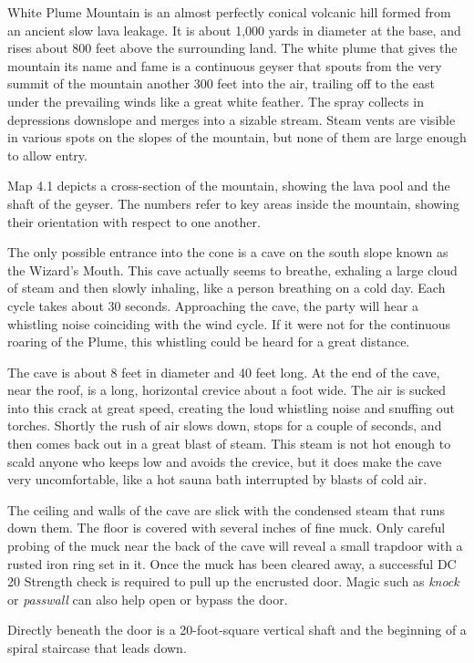 \documentclass[10pt,a4paper,twoside,bg=print,twocolumn,openany,nodeprecatedcode]{dndbook}
\begin{document}
White Plume Mountain is an almost perfectly conical volcanic hill formed from an ancient slow lava leakage. It is about 1,000 yards in diameter at the base, and rises about 800 feet above the surrounding land. The white plume that gives the mountain its name and fame is a continuous geyser that spouts from the very summit of the mountain another 300 feet into the air, trailing off to the east under the prevailing winds like a great white feather. The spray collects in depressions downslope and merges into a sizable stream. Steam vents are visible in various spots on the slopes of the mountain, but none of them are large enough to allow entry.

Map 4.1 depicts a cross-section of the mountain, showing the lava pool and the shaft of the geyser. The numbers refer to key areas inside the mountain, showing their orientation with respect to one another.

The only possible entrance into the cone is a cave on the south slope known as the Wizard's Mouth. This cave actually seems to breathe, exhaling a large cloud of steam and then slowly inhaling, like a person breathing on a cold day. Each cycle takes about 30 seconds. Approaching the cave, the party will hear a whistling noise coinciding with the wind cycle. If it were not for the continuous roaring of the Plume, this whistling could be heard for a great distance.

The cave is about 8 feet in diameter and 40 feet long. At the end of the cave, near the roof, is a long, horizontal crevice about a foot wide. The air is sucked into this crack at great speed, creating the loud whistling noise and snuffing out torches. Shortly the rush of air slows down, stops for a couple of seconds, and then comes back out in a great blast of steam. This steam is not hot enough to scald anyone who keeps low and avoids the crevice, but it does make the cave very uncomfortable, like a hot sauna bath interrupted by blasts of cold air.

The ceiling and walls of the cave are slick with the condensed steam that runs down them. The floor is covered with several inches of fine muck. Only careful probing of the muck near the back of the cave will reveal a small trapdoor with a rusted iron ring set in it. Once the muck has been cleared away, a successful DC 20 Strength check is required to pull up the encrusted door. Magic such as \textit{knock} or \textit{passwall} can also help open or bypass the door.

Directly beneath the door is a 20-foot-square vertical shaft and the beginning of a spiral staircase that leads down.
\end{document}
